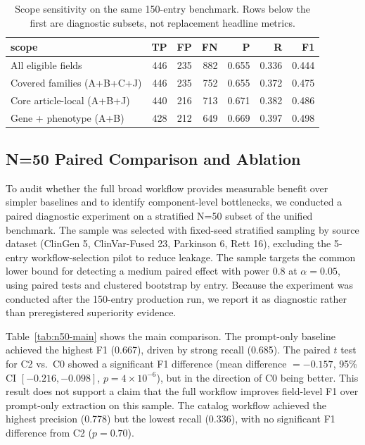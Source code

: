 \documentclass[conference]{IEEEtran}
\newcommand{\bmode}{broad}
\begin{document}
\begin{table}[t]
\centering
\caption{Scope sensitivity on the same 150-entry benchmark. Rows below the first are diagnostic subsets, not replacement headline metrics.}
\label{tab:scope}
\setlength{\tabcolsep}{3.5pt}
\renewcommand{\arraystretch}{1.08}
\small
\begin{tabular}{lrrrrrr}
\toprule
scope & TP & FP & FN & P & R & F1 \\
\midrule
All eligible fields & 446 & 235 & 882 & 0.655 & 0.336 & 0.444 \\
Covered families (A+B+C+J) & 446 & 235 & 752 & 0.655 & 0.372 & 0.475 \\
Core article-local (A+B+J) & 440 & 216 & 713 & 0.671 & 0.382 & 0.486 \\
Gene + phenotype (A+B) & 428 & 212 & 649 & 0.669 & 0.397 & 0.498 \\
\bottomrule
\end{tabular}
\end{table}

\subsection{N=50 Paired Comparison and Ablation}
To audit whether the full \bmode{} workflow provides measurable benefit over simpler baselines and to identify component-level bottlenecks, we conducted a paired diagnostic experiment on a stratified N=50 subset of the unified benchmark. The sample was selected with fixed-seed stratified sampling by source dataset (ClinGen 5, ClinVar-Fused 23, Parkinson 6, Rett 16), excluding the 5-entry workflow-selection pilot to reduce leakage. The sample targets the common lower bound for detecting a medium paired effect with power 0.8 at $\alpha=0.05$, using paired tests and clustered bootstrap by entry. Because the experiment was conducted after the 150-entry production run, we report it as diagnostic rather than preregistered superiority evidence.

Table~\ref{tab:n50-main} shows the main comparison. The prompt-only baseline achieved the highest F1 (0.667), driven by strong recall (0.685). The paired $t$ test for C2 vs.\ C0 showed a significant F1 difference (mean difference $=-0.157$, 95\% CI $[-0.216,-0.098]$, $p=4\times10^{-6}$), but in the direction of C0 being better. This result does not support a claim that the full workflow improves field-level F1 over prompt-only extraction on this sample. The catalog workflow achieved the highest precision (0.778) but the lowest recall (0.336), with no significant F1 difference from C2 ($p=0.70$).
\end{document}
